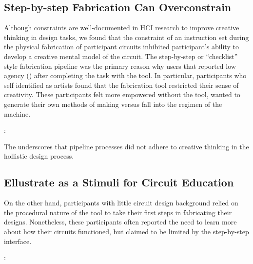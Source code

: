 \documentclass{sigchi}
\begin{document}
  \subsection{Step-by-step Fabrication Can Overconstrain}
  Although constraints are well-documented in HCI research to improve creative thinking in design tasks, we found that the constraint of an instruction set during the physical fabrication of participant circuits inhibited participant's ability to develop a creative mental model of the circuit. The step-by-step or ``checklist'' style fabrication pipeline was the primary reason why users that reported low agency () after completing the task with the tool. In particular, participants who self identified as artists found that the fabrication tool restricted their sense of creativity. These participants felt more empowered without the tool, wanted to generate their own methods of making versus fall into the regimen of the machine.  
  \begin{myquote}
   \vspace{-2pt}
    :
    \vspace{-2pt}
  \end{myquote}
  The underscores that pipeline processes did not adhere to creative thinking in the hollistic design process. 

  \subsection{Ellustrate as a Stimuli for Circuit Education}
  On the other hand, participants with little circuit design background relied on the procedural nature of the tool to take their first steps in fabricating their designs. Nonetheless, these participants often reported the need to learn more about how their circuits functioned, but claimed to be limited by the step-by-step interface.
  
  \begin{myquote}
   \vspace{-2pt}
    :
    \vspace{-2pt}
  \end{myquote}
  
\end{document}
